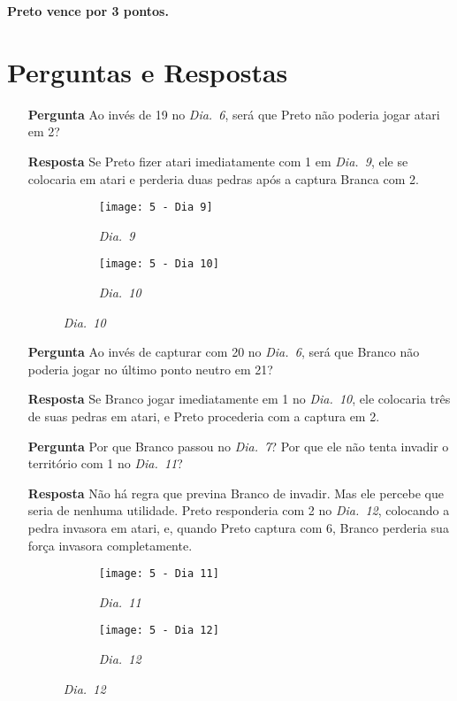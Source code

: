 \textbf{Preto vence por 3 pontos.}

\pagebreak

\section{Perguntas e Respostas}

\begin{itemize}
    \item[\textbf{Pergunta}]
      Ao invés de 19 no \emph{Dia.\@~6}, será que Preto não poderia jogar atari em 2?
    \item[\textbf{Resposta}] 
      Se Preto fizer atari imediatamente com 1 em \emph{Dia.\@~9}, ele se colocaria em atari e perderia  duas pedras após a captura Branca com 2.

    \begin{figure}[h!]
      \centering
      \begin{subfigure}[t]{.3\textwidth}
          \centering
          \texttt{[image: 5 - Dia 9]}
          \caption*{\emph{Dia.\@~9}}
      \end{subfigure}
      \hspace{1cm}
      \begin{subfigure}[t]{.3\textwidth}
          \centering
          \texttt{[image: 5 - Dia 10]}
          \caption*{\emph{Dia.\@~10}}
      \end{subfigure}
    \end{figure}

    \item[\textbf{Pergunta}]
      Ao invés de capturar com 20 no \emph{Dia.\@~6}, será que Branco não poderia jogar no último ponto neutro em 21?
    \item[\textbf{Resposta}] 
      Se Branco jogar imediatamente em 1 no \emph{Dia.\@~10}, ele colocaria três de suas pedras em atari, e Preto procederia com a captura em 2.
    \item[\textbf{Pergunta}]
      Por que Branco passou no \emph{Dia.\@~7}? Por que ele não tenta invadir o território com 1 no \emph{Dia.\@~11}?
    \item[\textbf{Resposta}] 
      Não há regra que previna Branco de invadir. Mas ele percebe que seria de nenhuma utilidade. Preto responderia com 2 no \emph{Dia.\@~12}, colocando a pedra invasora em atari, e, quando Preto captura com 6, Branco perderia sua força invasora completamente.

    \begin{figure}[h!]
      \centering
      \begin{subfigure}[t]{.3\textwidth}
          \centering
          \texttt{[image: 5 - Dia 11]}
          \caption*{\emph{Dia.\@~11}}
      \end{subfigure}
      \hspace{1cm}
      \begin{subfigure}[t]{.3\textwidth}
          \centering
          \texttt{[image: 5 - Dia 12]}
          \caption*{\emph{Dia.\@~12}}
      \end{subfigure}
    \end{figure}


\end{itemize}
